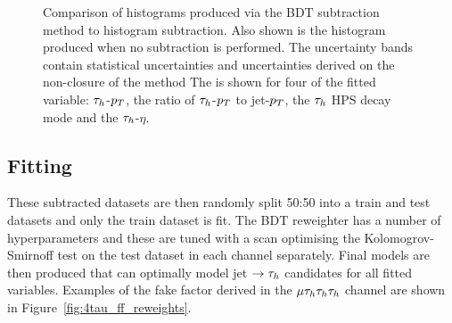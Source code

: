\begin{figure}[!hbtp]
\caption{Comparison of histograms produced via the BDT subtraction method to histogram subtraction. Also shown is the histogram produced when no subtraction is performed. The uncertainty bands contain statistical uncertainties and uncertainties derived on the non-closure of the method The is shown for four of the fitted variable: $\tau_{h}$-$p_{T}$, the ratio of $\tau_{h}$-$p_{T}$ to jet-$p_{T}$, the $\tau_{h}$ HPS decay mode and the $\tau_{h}$-$\eta$.}
\label{fig:4tau_ff_subtraction}
\end{figure}

\subsection{Fitting}

These subtracted datasets are then randomly split 50:50 into a train and test datasets and only the train dataset is fit. 
The BDT reweighter has a number of hyperparameters and these are tuned with a scan optimising the Kolomogrov-Smirnoff test \cite{} on the test dataset in each channel separately.
Final models are then produced that can optimally model jet $\rightarrow\tau_{h}$ candidates for all fitted variables. 
Examples of the fake factor derived in the $\mu\tau_{h}\tau_{h}\tau_{h}$ channel are shown in Figure~\ref{fig:4tau_ff_reweights}. \\

